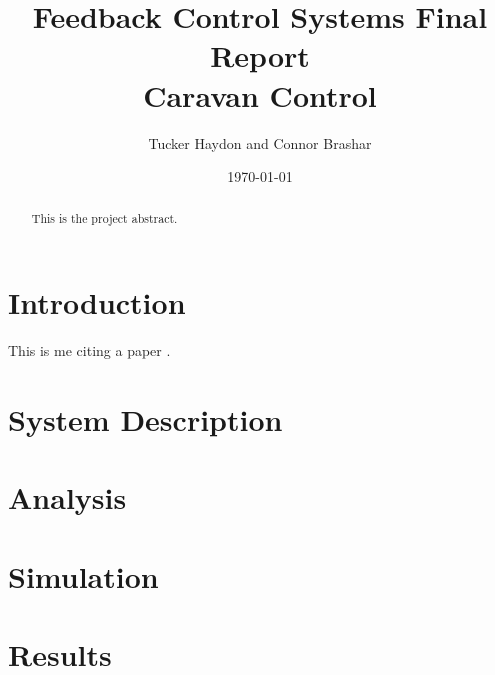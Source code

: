 \documentclass[12pt,onecolumn,reqno]{amsart}
\begin{document}
\title[]{Feedback Control Systems Final Report \\ Caravan Control}
\author[]{Tucker Haydon and Connor Brashar}
\address{The University of Texas at Austin}
\date{\today}
\begin{abstract}
  This is the project abstract.
\end{abstract}
\maketitle


\section{Introduction}
This is me citing a paper \cite{kalman1960new}.


\section{System Description}


\section{Analysis}


\section{Simulation}


\section{Results}




\end{document}
